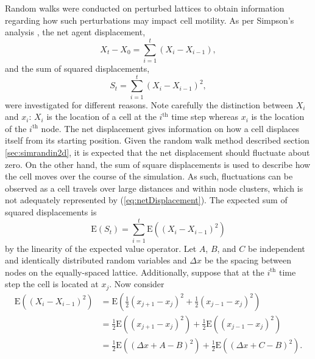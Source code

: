 \documentclass[11pt,a4paper]{article}
\begin{document}
			Random walks were conducted on perturbed lattices to obtain information regarding how such perturbations may impact cell motility. As per Simpson's analysis \cite{simpson2009diffusing}, the net agent displacement,
			\begin{equation}
				\label{eq:netDisplacement}
				X_t - X_0 = \sum_{i = 1}^{t} \left (X_i - X_{i-1} \right),
			\end{equation}
			and the sum of squared displacements,
			\begin{equation}
				\label{eq:sumSquaredDisplacement}
				S_t = \sum_{i = 1}^{t} \left (X_i - X_{i-1} \right)^2,
			\end{equation}
			were investigated for different reasons. Note carefully the distinction between $X_i$ and $x_i$: $X_i$ is the location of a cell at the $i^\text{th}$ time step whereas $x_i$ is the location of the $i^\text{th}$ node. The net displacement gives information on how a cell displaces itself from its starting position. Given the random walk method described section \ref{sec:simrandin2d}, it is expected that the net displacement should fluctuate about zero. On the other hand, the sum of square displacements is used to describe how the cell moves over the course of the simulation. As such, fluctuations can be observed as a cell travels over large distances and within node clusters, which is not adequately represented by (\ref{eq:netDisplacement}). The expected sum of squared displacements is
			\begin{equation}
				\label{eq:expectedSumSquaredDisp}
				\mathrm{E} \left(S_t \right) = \sum_{i = 1}^{t} \mathrm{E} \left( \left(X_i - X_{i-1} \right)^2 \right)
			\end{equation}
			by the linearity of the expected value operator. Let $A$, $B$, and $C$ be independent and identically distributed random variables and $\Delta x$ be the spacing between nodes on the equally-spaced lattice. Additionally, suppose that at the $i^\text{th}$ time step the cell is located at $x_j$. Now consider
			\begin{align*}
				\mathrm{E} \left( \left(X_i - X_{i-1} \right)^2 \right) &= \mathrm{E} \left( \frac{1}{2} \left(x_{j+1} - x_j \right)^2 + \frac{1}{2} \left(x_{j-1} - x_j \right)^2 \right) \\
				&= \frac{1}{2} \mathrm{E} \left(\left(x_{j+1} - x_j \right)^2 \right) + \frac{1}{2} \mathrm{E} \left(\left(x_{j-1} - x_j \right)^2 \right) \\
				&= \frac{1}{2} \mathrm{E} \left(\left(\Delta x + A - B \right)^2 \right) + \frac{1}{2} \mathrm{E} \left(\left(\Delta x + C - B \right)^2 \right).
			\end{align*}
\end{document}
